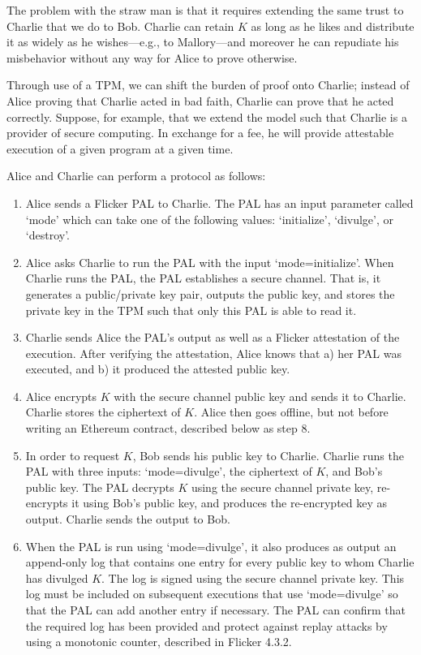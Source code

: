 \documentclass{article}
\begin{document}
The problem with the straw man is that it requires extending the same trust to Charlie that we do to Bob. Charlie can retain $K$ as long as he likes and distribute it as widely as he wishes---e.g., to Mallory---and moreover he can repudiate his misbehavior without any way for Alice to prove otherwise.

Through use of a TPM, we can shift the burden of proof onto Charlie; instead of Alice proving that Charlie acted in bad faith, Charlie can prove that he acted correctly. Suppose, for example, that we extend the model such that Charlie is a provider of secure computing. In exchange for a fee, he will provide attestable execution of a given program at a given time.

Alice and Charlie can perform a protocol as follows:

\begin{enumerate}

\item Alice sends a Flicker PAL to Charlie. The PAL has an input parameter called `mode' which can take one of the following values: `initialize', `divulge', or `destroy'.

\item Alice asks Charlie to run the PAL with the input `mode=initialize'. When Charlie runs the PAL, the PAL establishes a secure channel. That is, it generates a public/private key pair, outputs the public key, and stores the private key in the TPM such that only this PAL is able to read it.

\item Charlie sends Alice the PAL's output as well as a Flicker attestation of the execution. After verifying the attestation, Alice knows that a) her PAL was executed, and b) it produced the attested public key.

\item Alice encrypts $K$ with the secure channel public key and sends it to Charlie. Charlie stores the ciphertext of $K$. Alice then goes offline, but not before writing an Ethereum contract, described below as step 8.

\item In order to request $K$, Bob sends his public key to Charlie. Charlie runs the PAL with three inputs: `mode=divulge', the ciphertext of $K$, and Bob's public key. The PAL decrypts $K$ using the secure channel private key, re-encrypts it using Bob's public key, and produces the re-encrypted key as output. Charlie sends the output to Bob.

\item When the PAL is run using `mode=divulge', it also produces as output an append-only log that contains one entry for every public key to whom Charlie has divulged $K$. The log is signed using the secure channel private key. This log must be included on subsequent executions that use `mode=divulge' so that the PAL can add another entry if necessary. The PAL can confirm that the required log has been provided and protect against replay attacks by using a monotonic counter, described in Flicker 4.3.2.


\end{enumerate}
\end{document}
